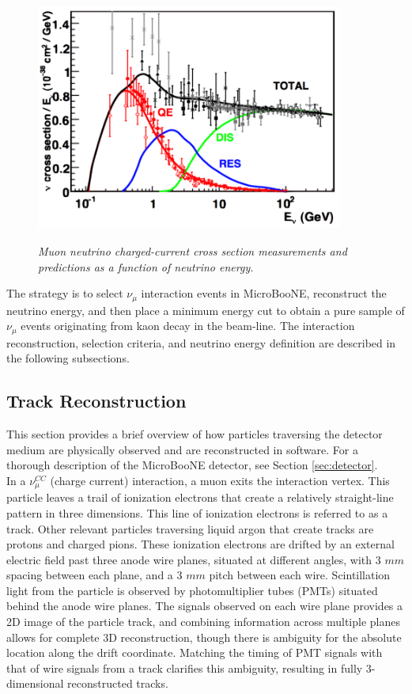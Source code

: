 \begin{figure}[ht!]
\centering
	\includegraphics[width=0.9\textwidth]{Figures/numu_xsec_breakdown.png} \\
\caption{\textit{Muon neutrino charged-current cross section measurements and predictions as a function of neutrino energy.}}\label{bnb_xsec_breakdown_fig}
\end{figure}

The strategy is to select $\nu_\mu$ interaction events in MicroBooNE, reconstruct the neutrino energy, and then place a minimum energy cut to obtain a pure sample of $\nu_\mu$ events originating from kaon decay in the beam-line. The interaction reconstruction, selection criteria, and neutrino energy definition are described in the following subsections.

\subsection{Track Reconstruction}
This section provides a brief overview of how particles traversing the detector medium are physically observed and are reconstructed in software. For a thorough description of the MicroBooNE detector, see Section \ref{sec:detector}.\\

In a $\nu_\mu^{CC}$ (charge current) interaction, a muon exits the interaction vertex. This particle leaves a trail of ionization electrons that create a relatively straight-line pattern in three dimensions. This line of ionization electrons is referred to as a track. Other relevant particles traversing liquid argon that create tracks are protons and charged pions. These ionization electrons are drifted by an external electric field past three anode wire planes, situated at different angles, with 3 $mm$ spacing between each plane, and a 3 $mm$ pitch between each wire. Scintillation light from the particle is observed by photomultiplier tubes (PMTs) situated behind the anode wire planes. The signals observed on each wire plane provides a 2D image of the particle track, and combining information across multiple planes allows for complete 3D reconstruction, though there is ambiguity for the absolute location along the drift coordinate. Matching the timing of PMT signals with that of wire signals from a track clarifies this ambiguity, resulting in fully 3-dimensional reconstructed tracks.\\

